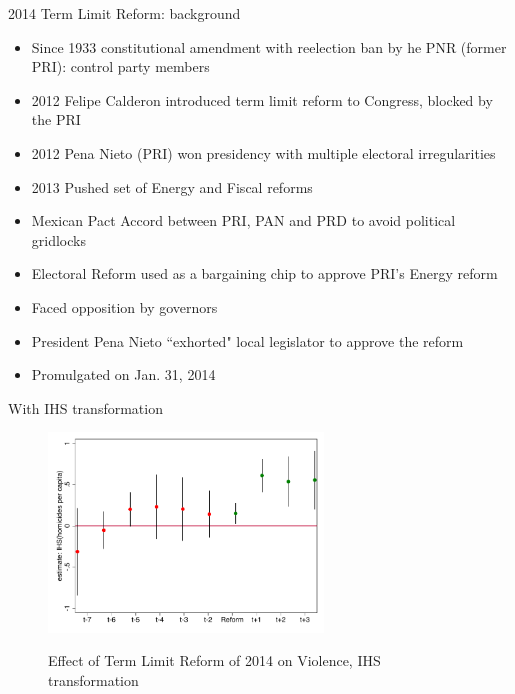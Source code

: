 \documentclass{beamer}
\begin{document}
\begin{frame}[label=reform_background, noframenumbering]{2014 Term Limit Reform: background}
 
\begin{itemize}
	\item Since 1933 constitutional amendment with reelection ban by he PNR (former PRI): control party members
	\item 2012 Felipe Calderon introduced term limit reform to Congress, blocked by the PRI
	\item 2012 Pena Nieto (PRI) won presidency with multiple electoral irregularities
	\item 2013 Pushed set of Energy and Fiscal reforms
	\item Mexican Pact Accord between PRI, PAN and PRD to avoid political gridlocks
	\item Electoral Reform used as a bargaining chip to approve PRI's Energy reform
	\item Faced opposition by governors
	\item President Pena Nieto ``exhorted" local legislator to approve the reform
	\item Promulgated on Jan. 31, 2014

\end{itemize} 
	
	 \hyperlink{reform_content}{} 
\end{frame} 
\begin{frame}[label=ihs_results, noframenumbering]{With IHS transformation}
\begin{figure}[h] 
\centering
\caption{Effect of Term Limit Reform of 2014 on Violence, IHS transformation}
\label{fig:event_study_ihs}
   
\includegraphics[width=0.65\textwidth]{Figures_pres/event_study_ihs.pdf}
       \captionsetup{justification=centering}
       
\hyperlink{main_results}{}

\end{figure}    

\end{frame} 
\end{document}
